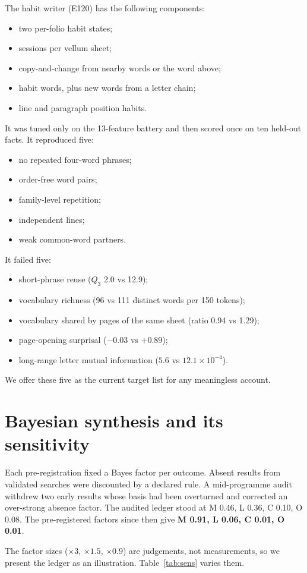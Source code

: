 \documentclass[11pt,a4paper]{article}
\begin{document}
The habit writer (E120) has the following components:
\begin{itemize}
\item two per-folio habit states;
\item sessions per vellum sheet;
\item copy-and-change from nearby words or the word above;
\item habit words, plus new words from a letter chain;
\item line and paragraph position habits.
\end{itemize}
It was tuned only on the 13-feature battery and then scored once on ten held-out facts. It reproduced five:
\begin{itemize}
\item no repeated four-word phrases;
\item order-free word pairs;
\item family-level repetition;
\item independent lines;
\item weak common-word partners.
\end{itemize}
It failed five:
\begin{itemize}
\item short-phrase reuse ($Q_3$ 2.0 vs 12.9);
\item vocabulary richness (96 vs 111 distinct words per 150 tokens);
\item vocabulary shared by pages of the same sheet (ratio 0.94 vs 1.29);
\item page-opening surprisal ($-0.03$ vs $+0.89$);
\item long-range letter mutual information ($5.6$ vs $12.1\times10^{-4}$).
\end{itemize}
We offer these five as the current target list for any meaningless account.

\section{Bayesian synthesis and its sensitivity}\label{sec:bayes}
Each pre-registration fixed a Bayes factor per outcome. Absent results from validated searches were discounted by a declared rule. A mid-programme audit withdrew two early results whose basis had been overturned and corrected an over-strong absence factor. The audited ledger stood at M 0.46, L 0.36, C 0.10, O 0.08. The pre-registered factors since then give \textbf{M 0.91, L 0.06, C 0.01, O 0.01}.

The factor sizes ($\times3$, $\times1.5$, $\times0.9$) are judgements, not measurements, so we present the ledger as an illustration. Table~\ref{tab:sens} varies them.
\end{document}
